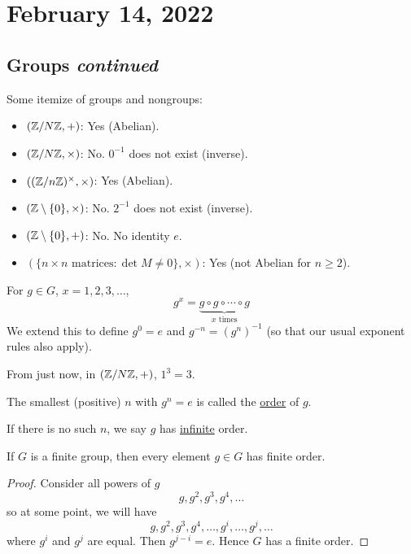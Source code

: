 \section{February 14, 2022}
\subsection{Groups \emph{continued}}
\begin{example}
    Some itemize of groups and nongroups:
    \begin{itemize}
        \item $(\mathbb Z/N\mathbb Z, +)$: Yes (Abelian).
        \item $(\mathbb Z/N\mathbb Z, \times)$: No. $0^{-1}$ does not exist (inverse).
        \item $((\mathbb Z/n\mathbb Z)^\times, \times)$: Yes (Abelian).
        \item $(\mathbb Z\setminus \{0\}, \times)$: No. $2^{-1}$ does not exist (inverse).
        \item $(\mathbb Z\setminus \{0\}, +)$: No. No identity $e$.
        \item $\left(\{n\times n\text{ matrices} : \det M \neq 0\}, \times\right)$: Yes (not Abelian for $n\geq 2$).
    \end{itemize}
\end{example}
\begin{definition}
    For $g\in G$, $x = 1, 2, 3, \dots$,
    \[g^x = \underbrace{g\circ g\circ \cdots \circ g}_{x\text{ times}}\]
    We extend this to define $g^0 = e$ and $g^{-n} = (g^n)^{-1}$ (so that our usual exponent rules also apply).
\end{definition}
\begin{example}
    From just now, in $(\mathbb Z/N\mathbb Z, +)$, $1^3 = 3$.
\end{example}
\begin{definition}
    The smallest (positive) $n$ with $g^n = e$ is called the \ul{order} of $g$.

    If there is no such $n$, we say $g$ has \ul{infinite} order.
\end{definition}
\begin{proposition}
    If $G$ is a finite group, then every element $g\in G$ has finite order.
\end{proposition}
\begin{proof}
    Consider all powers of $g$
    \[g, g^2, g^3, g^4, \dots\]
    so at some point, we will have
    \[g, g^2, g^3, g^4, \dots, g^i, \dots, g^j, \dots\]
    where $g^i$ and $g^j$ are equal. Then $g^{j-i} = e$. Hence $G$ has a finite order.
\end{proof}
